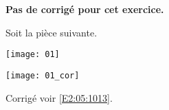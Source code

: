 \normaltrue \difficilefalse \tdifficilefalse
\correctionfalse


\setcounter{numques}{0}

\ifcorrection
\else
\textbf{Pas de corrigé pour cet exercice.}
\fi


\ifprof 
\else
Soit la pièce suivante.
\begin{center}
\texttt{[image: 01]}
\end{center}
 \fi
 
\ifprof\begin{center}
\texttt{[image: 01\_cor]}
\end{center}
\else 
\fi

\ifprof
\else
\begin{flushright}
\footnotesize{Corrigé  voir \ref{E2:05:1013}.}
\end{flushright}%
\fi
